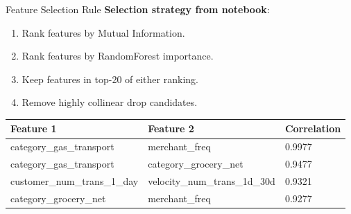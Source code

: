 \documentclass{beamer}
\begin{document}
\begin{frame}{Feature Selection Rule}
    \textbf{Selection strategy from notebook}:
    \begin{enumerate}
        \item Rank features by Mutual Information.
        \item Rank features by RandomForest importance.
        \item Keep features in top-20 of either ranking.
        \item Remove highly collinear drop candidates.
    \end{enumerate}

    \vspace{0.35cm}
    \begin{table}
        \centering
        \scriptsize
        \begin{tabular}{lll}
            \toprule
            \textbf{Feature 1} & \textbf{Feature 2} & \textbf{Correlation} \\
            \midrule
            category\_gas\_transport & merchant\_freq & 0.9977 \\
            category\_gas\_transport & category\_grocery\_net & 0.9477 \\
            customer\_num\_trans\_1\_day & velocity\_num\_trans\_1d\_30d & 0.9321 \\
            category\_grocery\_net & merchant\_freq & 0.9277 \\
            \bottomrule
        \end{tabular}
    \end{table}
\end{frame}
\end{document}
